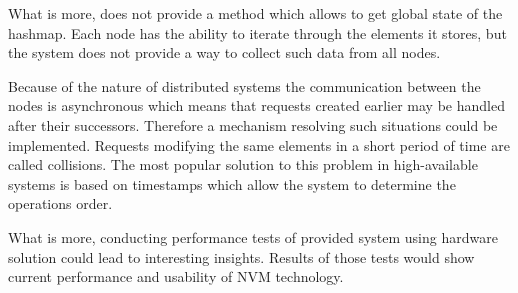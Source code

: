 What is more, \DHTS does not provide a method which allows to get global state of the hashmap. 
Each node has the ability to iterate through the elements it stores, but the system does not provide a way to collect such data from all nodes.

Because of the nature of distributed systems the communication between the nodes is asynchronous which means that requests created earlier may be handled after their successors.
Therefore a mechanism resolving such situations could be implemented.
Requests modifying the same elements in a short period of time are called collisions.
The most popular solution to this problem in high-available systems is based on timestamps which allow the system to determine the operations order.

What is more, conducting performance tests of provided system using hardware \PM solution could lead to interesting insights.
Results of those tests would show current performance and usability of NVM technology. 



